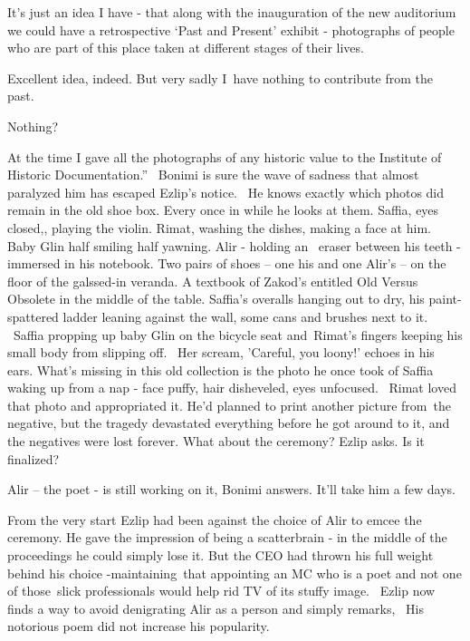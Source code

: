 \documentclass[letterpaper]{article}
\begin{document}
{\textquotedbl}It's just an idea I have - that along with the inauguration of the new auditorium we could have a
retrospective `Past and Present' exhibit - photographs of people who are part of this place taken at different stages
of their lives.{\textquotedbl} 

{\textquotedbl}Excellent idea, indeed. But very sadly I~have nothing to contribute from the past.{\textquotedbl} 

{\textquotedbl}Nothing?{\textquotedbl} 

{\textquotedbl}At the time I gave all the photographs of any historic value to the Institute of Historic
Documentation.'' \ Bonimi is sure the wave of sadness that\textcolor{red}{ }almost paralyzed him has escaped Ezlip's
notice. \ He knows exactly which photos did remain in the old shoe box. Every once in while he looks at them. Saffia,
eyes closed,, playing the violin. Rimat, washing the dishes, making a face at him. Baby Glin half smiling half yawning.
Alir - holding an\textcolor{red}{ }\ eraser between his teeth - immersed in his notebook. Two pairs of shoes -- one his
and one Alir's -- on the floor of the galssed-in veranda. A textbook of Zakod's entitled {\textquotedbl}Old Versus
Obsolete{\textquotedbl} in the middle of the table. Saffia's overalls hanging out to dry, his paint-spattered ladder
leaning against the wall, some cans and brushes next to it. ~Saffia propping up baby Glin on the bicycle seat
and~Rimat's fingers keeping his small body from slipping off. ~Her scream, 'Careful, you loony!' echoes in his ears.
What's missing in this old collection is the photo he once took of Saffia waking up from a nap - face puffy, hair
disheveled,\textcolor[rgb]{0.0,0.4392157,0.7529412}{ }\textcolor[rgb]{0.13333334,0.13333334,0.13333334}{eyes
unfocused.} ~Rimat loved that photo and appropriated it. He'd planned to print another picture from~the negative, but
the tragedy devastated everything before he got around to it, and the negatives were lost forever. {\textquotedbl}What
about the ceremony?{\textquotedbl} Ezlip asks. {\textquotedbl}Is it finalized?{\textquotedbl} 

{\textquotedbl}Alir -- the poet - is still working on it,{\textquotedbl} Bonimi answers. {\textquotedbl}It'll take him a
few days.{\textquotedbl} 

From the very start Ezlip had been against the choice of Alir to emcee the ceremony. He gave the impression of being a
scatterbrain - in the middle of the proceedings he could simply lose it. But the CEO had thrown his full weight behind
his choice -maintaining~that appointing an MC who is a poet and not one of those~slick professionals would help rid TV
of its stuffy image.\textcolor{red}{ }~Ezlip now finds a way to avoid denigrating Alir as a person and simply remarks,
\ {\textquotedbl}His notorious poem did not increase his popularity.{\textquotedbl} 
\end{document}
